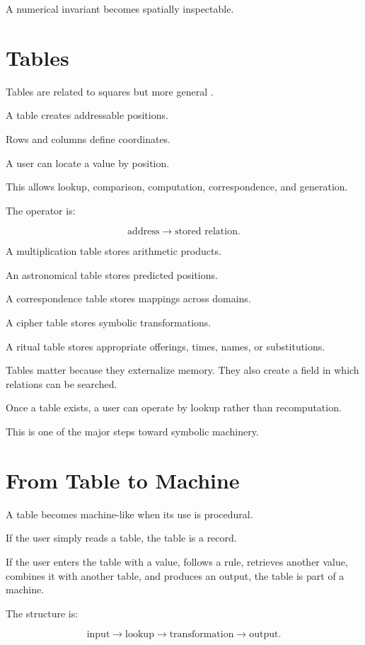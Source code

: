 \documentclass[11pt]{book}
\begin{document}
A numerical invariant becomes spatially inspectable.

\section{Tables}

Tables are related to squares but more general \cite{Neugebauer1957ExactSciences,HungerPingree1999AstralSciences,Yates1966ArtMemory,Kahn1996Codebreakers}.

A table creates addressable positions.

Rows and columns define coordinates.

A user can locate a value by position.

This allows lookup, comparison, computation, correspondence, and generation.

The operator is:

\[
\text{address} \rightarrow \text{stored relation}.
\]

A multiplication table stores arithmetic products.

An astronomical table stores predicted positions.

A correspondence table stores mappings across domains.

A cipher table stores symbolic transformations.

A ritual table stores appropriate offerings, times, names, or substitutions.

Tables matter because they externalize memory. They also create a field in which relations can be searched.

Once a table exists, a user can operate by lookup rather than recomputation.

This is one of the major steps toward symbolic machinery.

\section{From Table to Machine}

A table becomes machine-like when its use is procedural.

If the user simply reads a table, the table is a record.

If the user enters the table with a value, follows a rule, retrieves another value, combines it with another table, and produces an output, the table is part of a machine.

The structure is:

\[
\text{input}
\rightarrow
\text{lookup}
\rightarrow
\text{transformation}
\rightarrow
\text{output}.
\]
\end{document}
